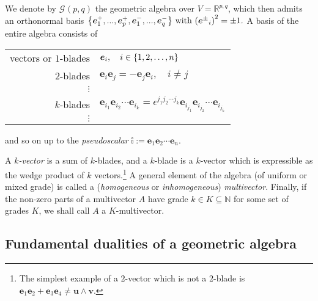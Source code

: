 \documentclass[12pt,a4paper]{article}
\renewcommand{\vb}[1]{\boldsymbol{#1}}
\newcommand{\GA}[1][]{\mathcal{G}_{#1}}
\newcommand{\vol}{\mathbb{i}}
\newcommand{\RR}{\mathds{R}}
\newcommand{\NN}{\mathds{N}}
\begin{document}
We denote by $\GA(p, q)$ the geometric algebra over $V = \RR^{p,q}$, which then admits an orthonormal basis
\begin{math}
	\qty{\vb{e}{}^+_1, ..., \vb{e}{}^+_p, \vb{e}{}^-_1, ..., \vb{e}{}^-_q}
	\text{ with }
	\qty(\vb{e}{}^\pm{}_i)^2 = \pm{}1
.\end{math}
A basis of the entire algebra consists of
\begin{center}
\begin{tabular}{rl}
	vectors or $1$-blades & $\vb{e}{}_i, \quad i \in{} \qty{1, 2, \dots, n}$
\\	$2$-blades & $\vb{e}{}_i\vb{e}{}_j = -\vb{e}{}_j\vb{e}{}_i, \quad i \not ={} j$
\\	$\vdots$
\\	$k$-blades & $\vb{e}{}_{i_1}\vb{e}{}_{i_2}\cdots\vb{e}{}_{i_k} = \epsilon{}^{j_1j_2\cdots j_k}\vb{e}{}_{i_{j_1}}\vb{e}{}_{i_{j_2}}\cdots\vb{e}{}_{i_{j_k}}$
\\	$\vdots$
\end{tabular}
\end{center}
and so on up to the \emph{pseudoscalar} $\vol :={} \vb{e}{}_1\vb{e}{}_2\cdots \vb{e}{}_n$.

A \emph{$k$-vector} is a sum of $k$-blades, and a $k$-blade is a $k$-vector which is expressible as the wedge product of $k$ vectors.\footnote{The simplest example of a $2$-vector which is not a $2$-blade is $\vb{e}{}_1\vb{e}{}_2 + \vb{e}{}_3\vb{e}{}_4 \not ={} \vb{u}{}\wedge{}\vb{v}{}$.}
A general element of the algebra (of uniform or mixed grade) is called a (\emph{homogeneous} or \emph{inhomogeneous}) \emph{multivector}.
Finally, if the non-zero parts of a multivector $A$ have grade $k \in K \subseteq \NN$ for some set of grades $K$, we shall call $A$ a $K$-multivector.



\subsection{Fundamental dualities of a geometric algebra}
\end{document}
